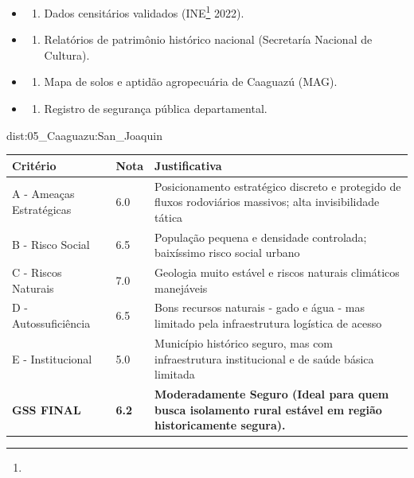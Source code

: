 {\begin{itemize}
\tightlist
\item
  \begin{enumerate}
  \def\labelenumi{\arabic{enumi})}
  \tightlist
  \item
    Dados censitários validados (INE\footnote{\fineINE} 2022).
  \end{enumerate}
\item
  \begin{enumerate}
  \def\labelenumi{\arabic{enumi})}
  \setcounter{enumi}{1}
  \tightlist
  \item
    Relatórios de patrimônio histórico nacional (Secretaría Nacional de
    Cultura).
  \end{enumerate}
\item
  \begin{enumerate}
  \def\labelenumi{\arabic{enumi})}
  \setcounter{enumi}{2}
  \tightlist
  \item
    Mapa de solos e aptidão agropecuária de Caaguazú (MAG).
  \end{enumerate}
\item
  \begin{enumerate}
  \def\labelenumi{\arabic{enumi})}
  \setcounter{enumi}{3}
  \tightlist
  \item
    Registro de segurança pública departamental.
  \end{enumerate}
\end{itemize}}{dist:05_Caaguazu:San_Joaquin}
\begin{table}[ht!]
\small \begin{tabular}{p{3.0cm}p{0.8cm}p{6.0cm}} \toprule
\textbf{Critério} & \textbf{Nota} & \textbf{Justificativa} \\ \midrule
A - Ameaças Estratégicas & 6.0 & Posicionamento estratégico discreto e protegido de fluxos rodoviários massivos; alta invisibilidade tática \\
B - Risco Social & 6.5 & População pequena e densidade controlada; baixíssimo risco social urbano \\
C - Riscos Naturais & 7.0 & Geologia muito estável e riscos naturais climáticos manejáveis \\
D - Autossuficiência & 6.5 & Bons recursos naturais - gado e água - mas limitado pela infraestrutura logística de acesso \\
E - Institucional & 5.0 & Município histórico seguro, mas com infraestrutura institucional e de saúde básica limitada \\
\midrule \textbf{GSS FINAL} & \textbf{6.2} & \textbf{Moderadamente Seguro (Ideal para quem busca isolamento rural estável em região historicamente segura).} \\ \bottomrule \end{tabular}
\end{table}
